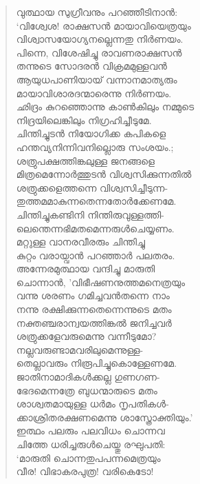 \begin{verse}
വുത്ഥായ സുഗ്രീവനും പറഞ്ഞീടിനാന്‍:\\
‘വിശ്വേശ! രാക്ഷസന്‍ മായാവിയെത്രയും\\
വിശ്വാസയോഗ്യനല്ലെന്നതു നിര്‍ണയം.\\
പിന്നെ, വിശേഷിച്ചു രാവണരാക്ഷസന്‍\\
തന്നുടെ സോദരന്‍ വിക്രമമുള്ളവന്‍\\
ആയുധപാണിയായ് വന്നാനമാത്യരും\\
മായാവിശാരദന്മാരെന്നു നിര്‍ണയം.\\
ഛിദ്രം കുറഞ്ഞൊന്നു കാണ്‍കിലും നമ്മുടെ\\
നിദ്രയിലെങ്കിലും നിഗ്രഹിച്ചീടുമേ.\\
ചിന്തിച്ചുടന്‍ നിയോഗിക്ക കപികളെ\\
ഹന്തവ്യനിന്നിവനില്ലൊരു സംശയം.;\\
ശത്രുപക്ഷത്തിങ്കലുള്ള ജനങ്ങളെ\\
മിത്രമെന്നോര്‍ത്തുടന്‍ വിശ്വസിക്കുന്നതില്‍\\
ശത്രുക്കളെത്തന്നെ വിശ്വസിച്ചീടുന്ന-\\
തുത്തമമാകുന്നതെന്നതോര്‍ക്കേണമേ.\\
ചിന്തിച്ചുകണ്ടിനി നിന്തിരുവുള്ളത്തി-\\
ലെന്തെന്നഭിമതമെന്നരുള്‍ചെയ്യണം.\\
മറ്റുള്ള വാനരവീരരും ചിന്തിച്ചു\\
കുറ്റം വരായ്വാന്‍ പറഞ്ഞാര്‍ പലതരം.\\
അന്നേരമുത്ഥായ വന്ദിച്ചു മാരുതി\\
ചൊന്നാന്‍, ’വിഭീഷണനുത്തമനെത്രയും\\
വന്നു ശരണം ഗമിച്ചവന്‍തന്നെ നാം\\
നന്നു രക്ഷിക്കുന്നതെന്നെന്നുടെ മതം\\
നക്തഞ്ചരാന്വയത്തിങ്കല്‍ ജനിച്ചവര്‍\\
ശത്രുക്കളേവരുമെന്നു വന്നീടുമോ?\\
നല്ലവരുണ്ടാമവരിലുമെന്നുള്ള-\\
തെല്ലാവരും നിരൂപിച്ചുകൊള്ളേണമേ.\\
ജാതിനാമാദികള്‍ക്കല്ല ഗുണഗണ-\\
ഭേദമെന്നത്രേ ബുധന്മാരുടെ മതം\\
ശാശ്വതമായുള്ള ധര്‍മം നൃപതികള്‍-\\
ക്കാശ്രിതരക്ഷണമെന്നു ശാസ്ത്രോക്തിയും.’\\
ഇത്ഥം പലരും പലവിധം ചൊന്നവ\\
ചിത്തേ ധരിച്ചരുള്‍ചെയ്തു രഘുപതി:\\
‘മാരുതി ചൊന്നതുപപന്നമെത്രയും\\
വീര! വിഭാകരപുത്ര! വരികെടോ!\\

\end{verse}
